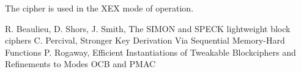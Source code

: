 \documentclass[11pt,a4paper]{report}
\begin{document}
        The cipher is used in the XEX mode of operation\cite{xex}.

    \begin{thebibliography}{9}
        R. Beaulieu, D. Shors, J. Smith, The SIMON and SPECK lightweight block ciphers
        C. Percival, Stronger Key Derivation Via Sequential Memory-Hard Functions
        P. Rogaway, Efficient Instantiations of Tweakable Blockciphers and Refinements to Modes OCB and PMAC
    \end{thebibliography}
\end{document}
